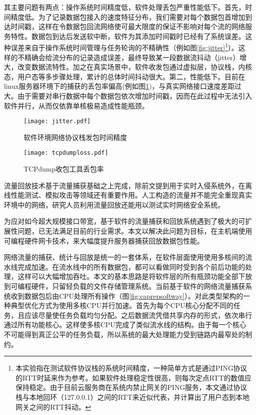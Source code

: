 其主要问题有两点：操作系统时间精度低，软件处理丢包严重性能低下。首先，时间精度低。为了记录数据包接入的速度特征分布，我们需要对每个数据包首增加到达时间戳，这样在令数据包回流网络使可最大限度的保证不影响对每个流的网络服务特性。数据包到达后发送软中断，软件为其添加时间戳时已经有了系统误差。这种误差来自于操作系统时间管理与任务轮询的不精确性（例如图\ref{fig:jitter}\footnote{本实验指在测试软件协议栈的系统时间精度，一种简单方式是通过PING协议的RTT时延来作为参考。如果软件处理稳定性很高，则每次定点RTT的数值应保持稳定。由于目前云服务商在系统内禁止网关的PING服务，本文通过协议栈与本地回环（127.0.0.1）之间的RTT来近似代表，并计算出了用户态到本地网关之间的RTT抖动。}）。这样的不精确会给流分布的记录造成误差，最终导致某一段数据流抖动（jitter）增大，改变数据流特性。加之在真实场景中，软件收发包通过虚拟层，协议栈，内核态，用户态等多步骤处理，累计的总体时间抖动很大。第二，性能低下。目前在linux服务器环境下的捕获的丢包率偏高(例如图\ref{fig:tcpdumploss})，与真实网络接口速度差距过大。由于需要对串行数据中每个数据包依次增加时间戳，因而在此过程中无法引入软件并行，从而仅依靠单核极易造成性能瓶颈。



\begin{figure}[htbp]
	\centering
	\begin{minipage}[t]{0.48\textwidth}
		\centering
		\texttt{[image: jitter.pdf]}
		\caption{软件环境网络协议栈发包时间精度} \label{fig:jitter}
	\end{minipage}
	\begin{minipage}[t]{0.48\textwidth}
		\centering
		\texttt{[image: tcpdumploss.pdf]}
		\caption{TCPdump收包工具丢包率} \label{fig:tcpdumploss}
	\end{minipage}
\end{figure}

流量回放技术基于流量捕获基础之上完成，除前文提到用于实时入侵系统外，在离线性能测试、模拟攻击等领域还有重要作用。人工构造的流量并不能完全重现真实环境中的网络，研究人员利用流量回放还能用以测试实时网络安全系统。

为应对如今超大规模接口带宽，基于软件的流量捕获和回放系统遇到了极大的可扩展性问题，已无法满足目前的行业需求。本文以解决此问题为目标，在主机端使用可编程硬件网卡技术，来大幅度提升服务器捕获回放数据包性能。




网络流量的捕获、统计与回放是统一的一套体系，在软件层面使用使用多核间的流水线完成加速。在流水线中的所有数据包，都可以看做同时受到各个前后功能的处理，这样可以大幅增加吞吐。本文的基本思路是将软件层的所有瓶颈功能全部下放到可编程硬件，只留轻负载的文件存储管理系统。当前基于软件的网络流量捕获系统收到数据包后由CPU处理所有操作（图\ref{fig:caprepsoftway}）。对此类型架构的一种典型优化方式为使用多核CPU并行加速。首先为每个CPU核心分配不同的任务，且应该尽量使任务负载均匀分配。之后数据流凭借共享内存的形式，依次串行通过所有功能核心。这样使多核CPU完成了类似流水线的结构。由于每一个核心不可能得到真正公平的任务负载，所以系统的最大处理能力受到链路内最窄处的制约。



